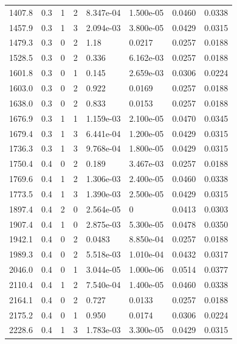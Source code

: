 \documentclass[preview]{standalone}
\begin{document}
{{{\begin{tabular}{L{1.2cm}C{1.2cm} C{0.3cm}C{0.5cm} C{1.4cm}C{1.4cm} C{1.4cm}C{1.4cm}}
  1407.8  &   0.3  & 1     &  2 &  8.347e-04  & 1.500e-05  & 0.0460 &  0.0338   \\ 
  1457.9  &   0.3  & 1     &  3 &  2.094e-03  & 3.800e-05  & 0.0429 &  0.0315   \\ 
  1479.3  &   0.3  & 0     &  2 &  1.18  & 0.0217  & 0.0257 &  0.0188   \\ 
  1528.5  &   0.3  & 0     &  2 &  0.336  & 6.162e-03  & 0.0257 &  0.0188   \\ 
  1601.8  &   0.3  & 0     &  1 &  0.145  & 2.659e-03  & 0.0306 &  0.0224   \\ 
  1603.0  &   0.3  & 0     &  2 &  0.922  & 0.0169  & 0.0257 &  0.0188   \\ 
  1638.0  &   0.3  & 0     &  2 &  0.833  & 0.0153  & 0.0257 &  0.0188   \\ 
  1676.9  &   0.3  & 1     &  1 &  1.159e-03  & 2.100e-05  & 0.0470 &  0.0345   \\ 
  1679.4  &   0.3  & 1     &  3 &  6.441e-04  & 1.200e-05  & 0.0429 &  0.0315   \\ 
  1736.3  &   0.3  & 1     &  3 &  9.768e-04  & 1.800e-05  & 0.0429 &  0.0315   \\ 
  1750.4  &   0.4  & 0     &  2 &  0.189  & 3.467e-03  & 0.0257 &  0.0188   \\ 
  1769.6  &   0.4  & 1     &  2 &  1.306e-03  & 2.400e-05  & 0.0460 &  0.0338   \\ 
  1773.5  &   0.4  & 1     &  3 &  1.390e-03  & 2.500e-05  & 0.0429 &  0.0315   \\ 
  1897.4  &   0.4  & 2     &  0 &  2.564e-05  & 0  & 0.0413 &  0.0303   \\ 
  1907.4  &   0.4  & 1     &  0 &  2.875e-03  & 5.300e-05  & 0.0478 &  0.0350   \\ 
  1942.1  &   0.4  & 0     &  2 &  0.0483  & 8.850e-04  & 0.0257 &  0.0188   \\ 
  1989.3  &   0.4  & 0     &  2 &  5.518e-03  & 1.010e-04  & 0.0432 &  0.0317   \\ 
  2046.0  &   0.4  & 0     &  1 &  3.044e-05  & 1.000e-06  & 0.0514 &  0.0377   \\ 
  2110.4  &   0.4  & 1     &  2 &  7.540e-04  & 1.400e-05  & 0.0460 &  0.0338   \\ 
  2164.1  &   0.4  & 0     &  2 &  0.727  & 0.0133  & 0.0257 &  0.0188   \\ 
  2175.2  &   0.4  & 0     &  1 &  0.950  & 0.0174  & 0.0306 &  0.0224   \\ 
  2228.6  &   0.4  & 1     &  3 &  1.783e-03  & 3.300e-05  & 0.0429 &  0.0315   \\ 

\end{tabular}}}}
\end{document}
